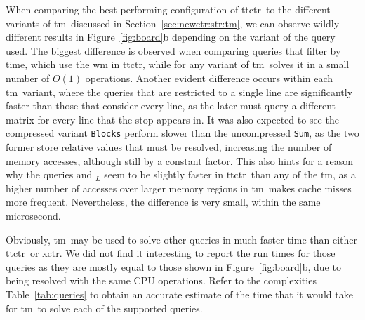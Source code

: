     When comparing the best performing configuration of \gls{ttctr}~to the different variants of \gls{tm}~discussed in Section~\ref{sec:newctr:str:tm}, we can observe wildly different results in Figure~\ref{fig:board}b depending on the variant of the \boardX query used. The biggest difference is observed when comparing queries that filter by time, which use the \gls{wm} in \gls{ttctr}, while for any variant of \gls{tm}~solves it in a small number of $O(1)$ operations. Another evident difference occurs within each \gls{tm}~variant, where the queries that are restricted to a single line are significantly faster than those that consider every line, as the later must query a different matrix for every line that the stop appears in. It was also expected to see the compressed variant \texttt{Blocks} perform slower than the uncompressed \texttt{Sum}, as the two former store relative values that must be resolved, increasing the number of memory accesses, although still by a constant factor. This also hints for a reason why the queries \boardX and \boardX$_{L}$ seem to be slightly faster in \gls{ttctr}~than any of the \gls{tm}, as a higher number of accesses over larger memory regions in \gls{tm}~makes cache misses more frequent. Nevertheless, the difference is very small, within the same microsecond.
    
    Obviously, \gls{tm}~may be used to solve other queries in much faster time than either \gls{ttctr}~or \gls{xctr}. We did not find it interesting to report the run times for those queries as they are mostly equal to those shown in Figure~\ref{fig:board}b, due to being resolved with the same CPU operations. Refer to the complexities Table~\ref{tab:queries} to obtain an accurate estimate of the time that it would take for \gls{tm}~to solve each of the supported queries.
